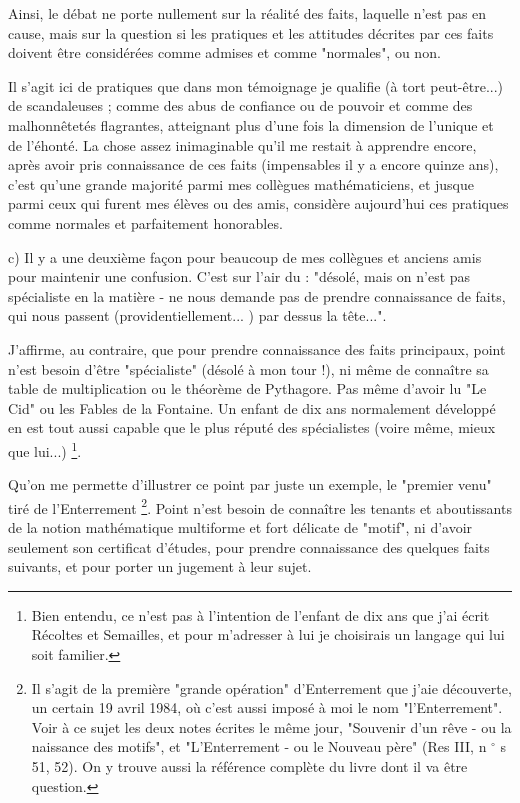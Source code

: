 Ainsi, le débat ne porte nullement sur la réalité des faits, laquelle n'est pas en cause, mais sur la question si les pratiques et les attitudes décrites par ces faits doivent être considérées comme admises et comme "normales", ou non.

Il s'agit ici de pratiques que dans mon témoignage je qualifie (à tort peut-être...) de scandaleuses ; comme des abus de confiance ou de pouvoir et comme des malhonnêtetés flagrantes, atteignant plus d'une fois la dimension de l'unique et de l'éhonté. La chose assez inimaginable qu'il me restait à apprendre encore, après avoir pris connaissance de ces faits (impensables il y a encore quinze ans), c'est qu'une grande majorité parmi mes collègues mathématiciens, et jusque parmi ceux qui furent mes élèves ou des amis, considère aujourd'hui ces pratiques comme normales et parfaitement honorables.

c) Il y a une deuxième façon pour beaucoup de mes collègues et anciens amis pour maintenir une confusion. C'est sur l'air du : "désolé, mais on n'est pas spécialiste en la matière - ne nous demande pas de prendre connaissance de faits, qui nous passent (providentiellement... ) par dessus la tête...".

J'affirme, au contraire, que pour prendre connaissance des faits principaux, point n'est besoin d'être "spécialiste" (désolé à mon tour !), ni même de connaître sa table de multiplication ou le théorème de Pythagore. Pas même d'avoir lu "Le Cid" ou les Fables de la Fontaine. Un enfant de dix ans normalement développé en est tout aussi capable que le plus réputé des spécialistes (voire même, mieux que lui...) \footnote{Bien entendu, ce n'est pas à l'intention de l'enfant de dix ans que j'ai écrit Récoltes et Semailles, et pour m'adresser à lui je choisirais un langage qui lui soit familier.}.

Qu'on me permette d'illustrer ce point par juste un exemple, le "premier venu" tiré de l'Enterrement \footnote{Il s'agit de la première "grande opération" d'Enterrement que j'aie découverte, un certain 19 avril 1984, où c'est aussi imposé à moi le nom "l'Enterrement". Voir à ce sujet les deux notes écrites le même jour, "Souvenir d'un rêve - ou la naissance des motifs", et "L'Enterrement - ou le Nouveau père" (Res III, n ${ }^{\circ}$ s 51, 52). On y trouve aussi la référence complète du livre dont il va être question.}. Point n'est besoin de connaître les tenants et aboutissants de la notion mathématique multiforme et fort délicate de "motif", ni d'avoir seulement son certificat d'études, pour prendre connaissance des quelques faits suivants, et pour porter un jugement à leur sujet.

